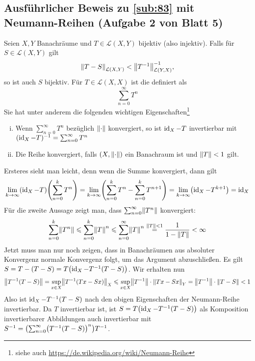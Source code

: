 \subsection{Ausführlicher Beweis zu \ref{sub:83} mit Neumann-Reihen (Aufgabe 2 von Blatt 5)} %
\label{sub:bew_83}
Seien $X,Y$ Banachräume und $T \in \mathcal{L}(X,Y)$ bijektiv (also injektiv). Falls für $S \in \mathcal{L}(X,Y)$ gilt 
\[
	\norm[\mathcal{L}(X,Y)]{T-S} < \norm[\mathcal{L}(Y,X)]{T^{-1}}^{-1}, 
\]
so ist auch $S$ bijektiv.
Für $T \in \mathcal{L}(X,X)$ ist die  definiert als 
\[
	\sum_{n=0}^{\infty} T^n
\]
Sie hat unter anderem die folgenden wichtigen Eigenschaften\footnote{siehe auch \url{https://de.wikipedia.org/wiki/Neumann-Reihe}}
\begin{enumerate}[(i)]
	\item Wenn $\sum_{n=0}^{\infty} T^n$ bezüglich $\norm{\cdot}$ konvergiert, so ist $\operatorname{id}_X - T$ invertierbar mit $(\operatorname{id}_X-T)^{-1}= \sum_{n=0}^{\infty}T^n$
	\item Die Reihe konvergiert, falls $(X,\norm{\cdot})$ ein Banachraum ist und $\norm{T}<1$ gilt.
\end{enumerate}
Ersteres sieht man leicht, denn wenn die Summe konvergiert, dann gilt
\[
	\lim_{k \to \infty} \enbrace*{\id_X -T} \enbrace*{\sum_{n=0}^{k} T^n} = \lim_{k \to \infty} \enbrace*{\sum_{n=0}^{k} T^n - \sum_{n=0}^{k} T^{n+1}} 
	= \lim_{k \to \infty} \enbrace*{\id_X - T^{k+1}} = \id_X
\]
Für die zweite Aussage zeigt man, dass $\sum_{n=0}^{\infty}\norm{T^n}$ konvergiert:
\[
	\sum_{n=0}^{k} \norm{T^n} \le \sum_{n=0}^{k} \norm{T}^n \le \sum_{n=0}^{\infty} \norm{T}^n \stackrel{\norm{T}<1}{=} \frac{1}{1- \norm{T}}< \infty    
\]
Jetzt muss man nur noch zeigen, dass in Banachräumen aus absoluter Konvergenz normale Konvergenz folgt, um das Argument abzuschließen.
Es gilt $S=T-(T-S)=T \enbrace*{\id_X - T ^{-1}(T-S)}$. Wir erhalten nun
\begin{align*}
	\norm{T ^{-1}(T-S)} = \sup_{x \in X} \norm[X]{T ^{-1} \enbrace*{T x- S x} } \le \sup_{x \in X} \norm{T ^{-1}} \cdot \norm[Y]{T x- S x}
	= \norm{T ^{-1}} \cdot \norm{T-S} < 1  
\end{align*}
Also ist $\operatorname{id}_X - T ^{-1}(T-S)$ nach den obigen Eigenschaften der Neumann-Reihe invertierbar. Da $T$ invertierbar ist, ist $S= T \enbrace*{\id_X - T ^{-1}(T-S)}$ als Komposition 
invertierbarer Abbildungen auch invertierbar mit $S ^{-1} = \enbrace*{\sum_{n=0}^\infty \enbrace*{T ^{-1}(T-S)}^n} T ^{-1}$. \bewende

\cleardoubleoddemptypage
{}
\setcounter{page}{1}
\printindex
\listoffigures
\todototoc
{}

